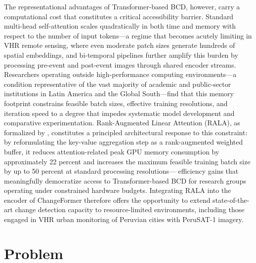 The representational advantages of Transformer-based BCD, however, carry a
computational cost that constitutes a critical accessibility barrier. Standard
multi-head self-attention scales quadratically in both time and memory with
respect to the number of input tokens---a regime that becomes acutely limiting
in VHR remote sensing, where even moderate patch sizes generate hundreds of
spatial embeddings, and bi-temporal pipelines further amplify this burden by
processing pre-event and post-event images through shared encoder streams.
Researchers operating outside high-performance computing environments---a
condition representative of the vast majority of academic and public-sector
institutions in Latin America and the Global South---find that this memory
footprint constrains feasible batch sizes, effective training resolutions, and
iteration speed to a degree that impedes systematic model development and
comparative experimentation. Rank-Augmented Linear Attention (RALA), as
formalized by \cite{Fan2025RALA}, constitutes a principled architectural
response to this constraint: by reformulating the key-value aggregation step as
a rank-augmented weighted buffer, it reduces attention-related peak GPU memory
consumption by approximately 22 percent and increases the maximum feasible
training batch size by up to 50 percent at standard processing resolutions---
efficiency gains that meaningfully democratize access to Transformer-based BCD
for research groups operating under constrained hardware budgets. Integrating
RALA into the encoder of ChangeFormer therefore offers the opportunity to extend
state-of-the-art change detection capacity to resource-limited environments,
including those engaged in VHR urban monitoring of Peruvian cities with
PeruSAT-1 imagery.


\section{Problem}

